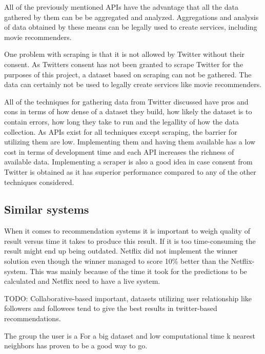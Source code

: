 All of the previously mentioned APIs have the advantage that all the data gathered by them can be be aggregated and analyzed. Aggregations and analysis of data obtained by these means can be legally used to create services, including movie recommenders.

One problem with scraping is that it is not allowed by Twitter without their consent. As Twitters consent has not been granted to scrape Twitter for the purposes of this project, a dataset based on scraping can not be gathered. The data can certainly not be used to legally create services like movie recommenders.

All of the techniques for gathering data from Twitter discussed have pros and cons in terms of how dense of a dataset they build, how likely the dataset is to contain errors, how long they take to run and the legallity of how the data collection. As APIs exist for all techniques except scraping, the barrier for utilizing them are low. Implementing them and having them available has a low cost in terms of development time and each API increases the richness of available data. Implementing a scraper is also a good idea in case consent from Twitter is obtained as it has superior performance compared to any of the other techniques considered.

\subsection{Similar systems}
When it comes to recommendation systems it is important to weigh quality of result versus time it takes to produce this result. If it is too time-consuming the result might end up being outdated. Netflix did not implement the winner solution even though the winner managed to score 10\% better than the Netflix-system. This was mainly because of the time it took for the predictions to be calculated and Netflix need to have a live system.

TODO: Collaborative-based important, datasets utilizing user relationship like followers and followees tend to give the best results in twitter-based recommendations.

The group the user is a
For a big dataset and low computational time k nearest neighbors has proven to be a good way to go.
